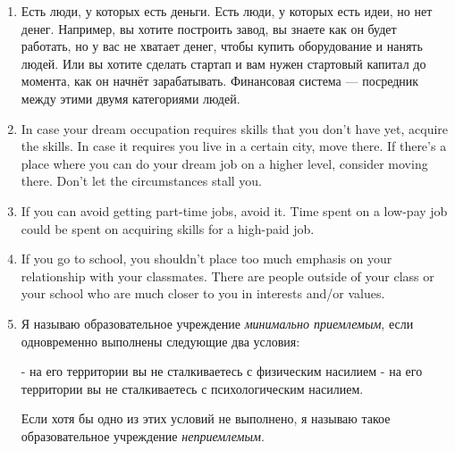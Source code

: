\documentclass[11pt]{article}
\theoremstyle{remark}
\theoremstyle{definition}
\begin{document}
\begin{enumerate}
\item Есть люди, у которых есть деньги. Есть люди, у которых есть идеи, но нет денег. Например, вы хотите построить завод, вы знаете как он будет работать, но у вас не хватает денег, чтобы купить оборудование и нанять людей. Или вы хотите сделать стартап и вам нужен стартовый капитал до момента, как он начнёт зарабатывать. Финансовая система --- посредник между этими двумя категориями людей.




























\item In case your dream occupation requires skills that you don't have yet, acquire the skills. In case it requires you live in a certain city, move there. If there's a place where you can do your dream job on a higher level, consider moving there. Don't let the circumstances stall you.

\item If you can avoid getting part-time jobs, avoid it. Time spent on a low-pay job could be spent on acquiring skills for a high-paid job.

\item If you go to school, you shouldn't place too much emphasis on your relationship with your classmates. There are people outside of your class or your school who are much closer to you in interests and/or values.





\item Я называю образовательное учреждение \textit{минимально приемлемым}, если одновременно выполнены следующие два условия:

- на его территории вы не сталкиваетесь с физическим насилием
- на его территории вы не сталкиваетесь с психологическим насилием.

Если хотя бы одно из этих условий не выполнено, я называю такое образовательное учреждение \textit{неприемлемым}.


\end{enumerate}
\end{document}
